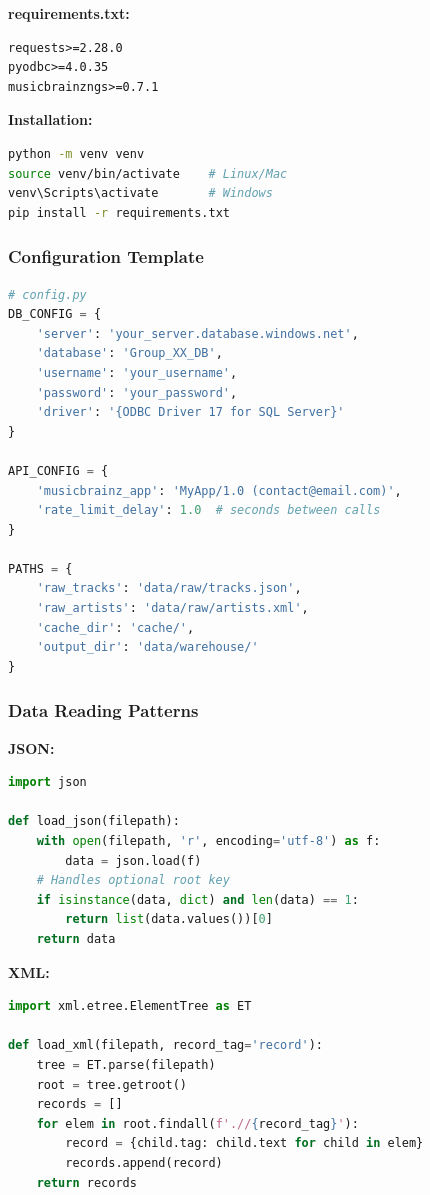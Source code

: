 \textbf{requirements.txt:}
\begin{lstlisting}
requests>=2.28.0
pyodbc>=4.0.35
musicbrainzngs>=0.7.1
\end{lstlisting}

\textbf{Installation:}
\begin{lstlisting}[language=bash]
python -m venv venv
source venv/bin/activate    # Linux/Mac
venv\Scripts\activate       # Windows
pip install -r requirements.txt
\end{lstlisting}

\subsubsection{Configuration Template}
\label{subsec:config-template}

\begin{lstlisting}[language=Python]
# config.py
DB_CONFIG = {
    'server': 'your_server.database.windows.net',
    'database': 'Group_XX_DB',
    'username': 'your_username',
    'password': 'your_password',
    'driver': '{ODBC Driver 17 for SQL Server}'
}

API_CONFIG = {
    'musicbrainz_app': 'MyApp/1.0 (contact@email.com)',
    'rate_limit_delay': 1.0  # seconds between calls
}

PATHS = {
    'raw_tracks': 'data/raw/tracks.json',
    'raw_artists': 'data/raw/artists.xml',
    'cache_dir': 'cache/',
    'output_dir': 'data/warehouse/'
}
\end{lstlisting}

\subsubsection{Data Reading Patterns}
\label{subsec:data-reading-patterns}

\textbf{JSON:}
\begin{lstlisting}[language=Python]
import json

def load_json(filepath):
    with open(filepath, 'r', encoding='utf-8') as f:
        data = json.load(f)
    # Handles optional root key
    if isinstance(data, dict) and len(data) == 1:
        return list(data.values())[0]
    return data
\end{lstlisting}

\textbf{XML:}
\begin{lstlisting}[language=Python]
import xml.etree.ElementTree as ET

def load_xml(filepath, record_tag='record'):
    tree = ET.parse(filepath)
    root = tree.getroot()
    records = []
    for elem in root.findall(f'.//{record_tag}'):
        record = {child.tag: child.text for child in elem}
        records.append(record)
    return records
\end{lstlisting}

